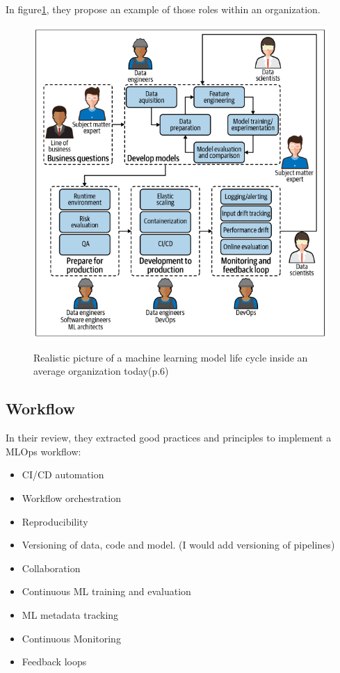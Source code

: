 In figure\ref{fig:mlop-people}, they propose an example of those roles within an organization.
\begin{figure}[!htbp]
    \caption{Realistic picture of a machine learning model life cycle inside an average
    organization today\cite{treveil2020introducing}(p.6)}
    \centering
    \includegraphics[scale=0.5]{images/mlops-people}
    \label{fig:mlop-people}
\end{figure}

\subsection{Workflow}\label{subsec:workflow}

In their review\cite{Kreuzberger2022MachineLO}, they extracted good practices and principles to implement a MLOps workflow:

\begin{itemize}
    \item CI/CD automation
    \item Workflow orchestration
    \item Reproducibility
    \item Versioning of data, code and model. (I would add versioning of pipelines)
    \item Collaboration
    \item Continuous ML training and evaluation
    \item ML metadata tracking
    \item Continuous Monitoring
    \item Feedback loops
\end{itemize}

